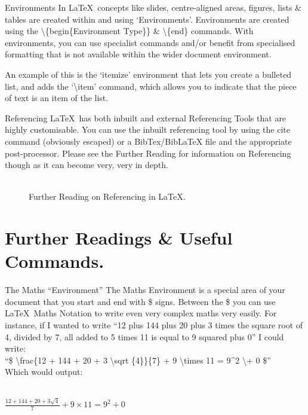 \documentclass{beamer}
\begin{document}
\begin{frame}{Environments}%
In \LaTeX~concepts like slides, centre-aligned areas, figures, lists \& tables are created within and using `Environments'. Environments are created using the \textbackslash\{begin\{Environment Type\}\} \&  \textbackslash\{end\} commands. With environments, you can use specialist commands and/or benefit from specialised formatting that is not available within the wider document environment.\par
An example of this is the `itemize' environment that lets you create a bulleted list, and adds the  `\textbackslash item' command, which allows you to indicate that the piece of text is an item of the list.
\end{frame}

\begin{frame}{Referencing}
\LaTeX~has both inbuilt and external Referencing Tools that are highly customisable. You can use the inbuilt referencing tool by using the cite command (obviously escaped) or a BibTex/BibLaTeX file and the appropriate post-processor. Please see the Further Reading for information on Referencing though as it can become very, very in depth.
\begin{figure}[h]
\\
Further Reading on Referencing in \LaTeX.
\end{figure}
\end{frame}

\section{Further Readings \& Useful Commands.}
\begin{frame}{The Maths ``Environment''}
The Maths Environment is a special area of your document that you start and end with \$ signs. Between the \$ you can use \LaTeX~Maths Notation to write even very complex maths very easily. For instance, if I wanted to write ``12 plus 144 plus 20 plus 3 times the square root of 4, divided by 7, all added to 5 times 11 is equal to 9 squared plus 0'' I could write:\\ ``\$ \textbackslash frac\{12 + 144 + 20 + 3 \textbackslash sqrt \{4\}\}\{7\}  + 9 \textbackslash times 11 = 9\^{}{2} \textbackslash + 0 \$''\\
Which would output:\begin{centering}\\$\frac{12+144+20+3\sqrt{4}}{7} + 9 \times 11 = 9^2 + 0$\end{centering}
\end{frame}
\end{document}
